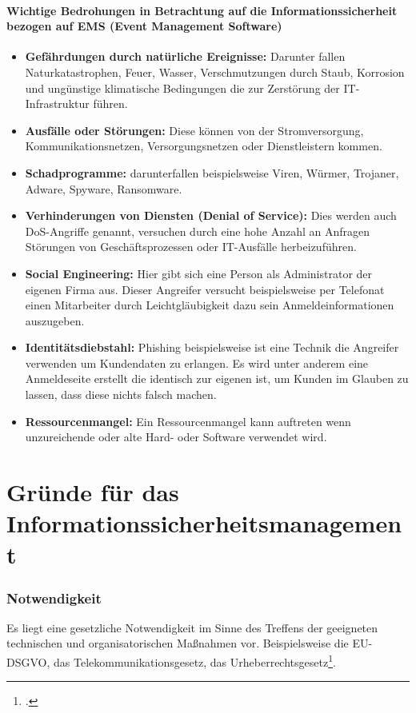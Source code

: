 \paragraph{Wichtige Bedrohungen in Betrachtung auf die Informationssicherheit bezogen auf EMS (Event Management Software)} %
\begin{itemize}
	\item \textbf{Gefährdungen durch natürliche Ereignisse:} Darunter fallen Naturkatastrophen, Feuer, Wasser, Verschmutzungen durch Staub, Korrosion und ungünstige klimatische Bedingungen die zur Zerstörung der IT-Infrastruktur führen.
	\item \textbf{Ausfälle oder Störungen:} Diese können von der Stromversorgung, Kommunikationsnetzen, Versorgungsnetzen oder Dienstleistern kommen.
	\item \textbf{Schadprogramme:} darunterfallen beispielsweise Viren, Würmer, Trojaner, Adware, Spyware, Ransomware.
	\item \textbf{Verhinderungen von Diensten (Denial of Service):} Dies werden auch DoS-Angriffe genannt, versuchen durch eine hohe Anzahl an Anfragen Störungen von Geschäftsprozessen oder IT-Ausfälle herbeizuführen.
	\item \textbf{Social Engineering:} Hier gibt sich eine Person als Administrator der eigenen Firma aus. Dieser Angreifer versucht beispielsweise per Telefonat einen Mitarbeiter durch Leichtgläubigkeit dazu sein Anmeldeinformationen auszugeben.
	\item \textbf{Identitätsdiebstahl:} Phishing beispielsweise ist eine Technik die Angreifer verwenden um Kundendaten zu erlangen. Es wird unter anderem eine Anmeldeseite erstellt die identisch zur eigenen ist, um Kunden im Glauben zu lassen, dass diese nichts falsch machen.
	\item \textbf{Ressourcenmangel:} Ein Ressourcenmangel kann auftreten wenn unzureichende oder alte Hard- oder Software verwendet wird. 
\end{itemize}

\section{Gründe für das Informationssicherheitsmanagement}
\subsubsection{Notwendigkeit}
Es liegt eine gesetzliche Notwendigkeit im Sinne des Treffens der geeigneten technischen und organisatorischen Maßnahmen vor. Beispielsweise die EU-DSGVO, das Telekommunikationsgesetz, das Urheberrechtsgesetz\footcite{Lehrunterlagen-HTL-cloud}.


